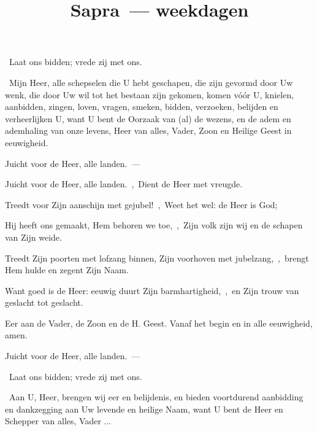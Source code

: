 \documentclass[12pt,twoside,a5paper]{article}
\begin{document}
\title{Sapra~--- weekdagen}
\author{}
\date{}
\maketitle


\begin{halfparskip}
  \dd~Laat ons bidden; vrede zij met ons.

  \cc~Mijn Heer, alle schepselen die U hebt geschapen, die zijn gevormd door Uw wenk, die door Uw wil tot het bestaan zijn gekomen, komen vóór U, knielen, aanbidden, zingen, loven, vragen, smeken, bidden, verzoeken, belijden en verheerlijken U, want U bent de Oorzaak van (al) de wezens, en de adem en ademhaling van onze levens, Heer van alles, Vader, Zoon en Heilige Geest in eeuwigheid.
\end{halfparskip}


\begin{halfparskip}
   Juicht voor de Heer, alle landen.~--- 

  Juicht voor de Heer, alle landen.~\sep\ Dient de Heer met vreugde.

  Treedt voor Zijn aanschijn met gejubel!~\sep\ Weet het wel: de Heer is God;

  Hij heeft ons gemaakt, Hem behoren we toe,~\sep\ Zijn volk zijn wij en de schapen van Zijn weide.

  Treedt Zijn poorten met lofzang binnen, Zijn voorhoven met jubelzang,~\sep\ brengt Hem hulde en zegent Zijn Naam.

  Want goed is de Heer: eeuwig duurt Zijn barmhartigheid,~\sep\ en Zijn trouw van geslacht tot geslacht.

  Eer aan de Vader, de Zoon en de H. Geest. Vanaf het begin en in alle eeuwigheid, amen.

   Juicht voor de Heer, alle landen.~--- 
\end{halfparskip}

\begin{halfparskip}
  \dd~Laat ons bidden; vrede zij met ons.

  \cc~Aan U, Heer, brengen wij eer en belijdenis, en bieden voortdurend aanbidding en dankzegging aan Uw levende en heilige Naam, want U bent de Heer en Schepper van alles, Vader ...
\end{halfparskip}
\end{document}
